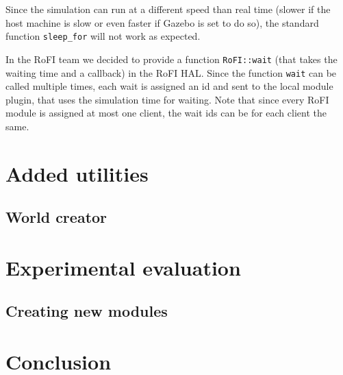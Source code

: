 \documentclass[
  digital, %
  table,   %
  oneside, %
  nolof,     %
  nolot,     %
]{fithesis3}
\newcommand{\code}[1]{\texttt{#1}}
\begin{document}
Since the simulation can run at a different speed than real time (slower if the host machine is slow or even faster if Gazebo is set to do so), the standard function \code{sleep\_for} will not work as expected.

In the RoFI team we decided to provide a function \code{RoFI::wait} (that takes the waiting time and a callback) in the RoFI HAL.
Since the function \code{wait} can be called multiple times, each wait is assigned an id and sent to the local module plugin, that uses the simulation time for waiting.
Note that since every RoFI module is assigned at most one client, the wait ids can be for each client the same.


\chapter{Added utilities}

\section{World creator}



\chapter{Experimental evaluation}

\section{Creating new modules}
\label{ex-modules}



\chapter{Conclusion}
\end{document}
